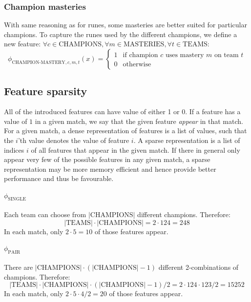 \subsubsection{Champion masteries}
With same reasoning as for runes, some masteries are better suited for particular champions. To capture the runes used by the different champions, we define a new feature:
$\forall c \in \text{CHAMPIONS}, \forall m \in \text{MASTERIES}, \forall t \in \text{TEAMS}$:
\begin{equation}\label{eq:championmastery}
  \phi_{\text{CHAMPION-MASTERY},c,m,t}(x) =
\begin{cases} 
  1 & \text{if champion } c \text{ uses mastery } m \text{ on team } t\\
  0 & \text{otherwise} 
\end{cases}
\end{equation}

\subsection{Feature sparsity}\label{sec:featuresparsity}
All of the introduced features can have value of either 1 or 0. If a feature has a value of $1$ in a given match, we say that the given feature \emph{appear} in that match.
For a given match, a dense representation of features is a list of values, such that the $i$'th value denotes the value of feature $i$.
A sparse representation is a list of indices $i$ of all features that appear in the given match.
If there in general only appear very few of the possible features in any given match, a sparse representation may be more memory efficient and hence provide better performance and thus be favourable.

\paragraph{$\phi_{\text{SINGLE}}$}
\begin{adjustwidth}{2cm}{}
    Each team can choose from $|\text{CHAMPIONS}|$ different champions. Therefore:
    \[|\text{TEAMS}| \cdot |\text{CHAMPIONS}| = 2 \cdot 124 = 248\] In each match, only $2 \cdot 5 = 10$ of those features appear.
\end{adjustwidth}

\paragraph{$\phi_{\text{PAIR}}$}
\begin{adjustwidth}{2cm}{}
    There are $|\text{CHAMPIONS}| \cdot (|\text{CHAMPIONS}|-1)$ different 2-combinations of champions. Therefore:
    \[|\text{TEAMS}| \cdot |\text{CHAMPIONS}| \cdot (|\text{CHAMPIONS}|-1) / 2 = 2 \cdot 124 \cdot 123 / 2 = 15252\] In each match, only $2 \cdot 5 \cdot 4 / 2 = 20$ of those features appear.
\end{adjustwidth}

